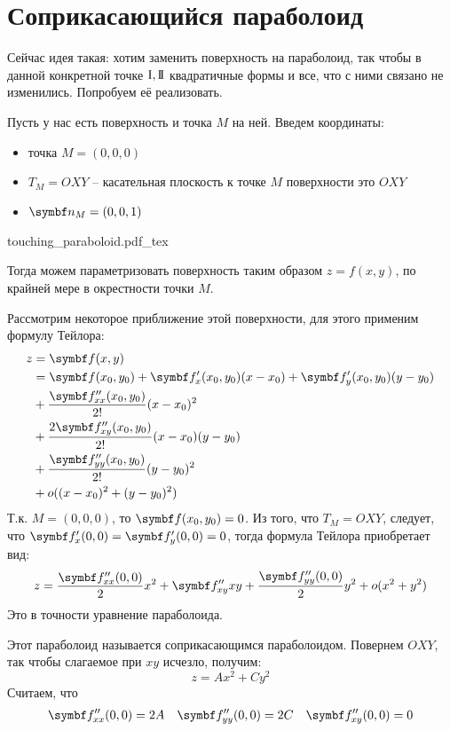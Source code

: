 \documentclass[main]{subfiles}
\begin{document}
\chapter{Соприкасающийся параболоид}
Сейчас идея такая: хотим заменить поверхность на параболоид, так чтобы в данной конкретной точке $\mathrm{I}, \mathrm{I\!I}$ квадратичные формы и все, что с ними связано не изменились.
Попробуем её реализовать.

Пусть у нас есть поверхность и точка $M$ на ней.
Введем координаты:
\begin{itemize}
    \item точка $M = (0,0,0)$
    \item $T_M = OXY$ -- касательная плоскость к точке $M$ поверхности это $OXY$
    \item $\vn_M = (0,0,1)$
\end{itemize}
\begin{center}
    {touching_paraboloid.pdf_tex}
\end{center}
Тогда можем параметризовать поверхность таким образом $z = f(x,y)$, по крайней мере в окрестности точки $M$.

Рассмотрим некоторое приближение этой поверхности, для этого применим формулу Тейлора:
\begin{align*}
    z & = \vf(x,y)                                                       \\
      & = \vf(x_0,y_0) + \vf'_x(x_0,y_0)(x-x_0) + \vf'_y(x_0,y_0)(y-y_0) \\
      & + \frac{\vf''_{xx}(x_0,y_0)}{2!}(x-x_0)^2                        \\
      & + \frac{2 \vf''_{xy}(x_0,y_0)}{2!}(x- x_0)(y-y_0)                \\
      & + \frac{\vf''_{yy}(x_0,y_0)}{2!}(y-y_0)^2                        \\
      & +o((x-x_0)^2 +(y-y_0)^2)
\end{align*}
Т.к. $M = (0,0,0)$, то $\vf(x_0,y_0) = 0$.
Из того, что $T_M = OXY$, следует, что $\vf'_x(0,0) = \vf'_y(0,0)=0$, тогда формула Тейлора приобретает вид:
\[z = \frac{\vf''_{xx}(0,0)}{2}x^2 + \vf''_{xy}xy + \frac{\vf''_{yy}(0,0)}{2} y^2 + o(x^2 + y^2)\]
Это в точности уравнение параболоида.
\begin{definition}
    Этот параболоид называется соприкасающимся параболоидом.
    Повернем $OXY$, так чтобы  слагаемое при $xy$ исчезло, получим:
    \[z = Ax^2 + Cy^2\]
    Считаем, что
    \begin{align*}
        \vf''_{xx}(0,0) & = 2A & \vf''_{yy}(0,0) & =2C & \vf''_{xy}(0,0) = 0
    \end{align*}
\end{definition}
\end{document}
